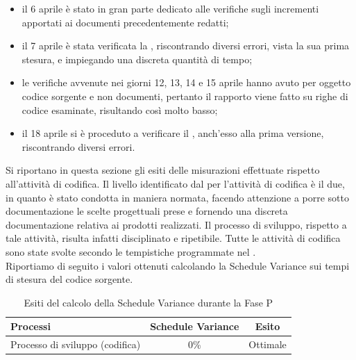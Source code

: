 \begin{itemize}
	\item il 6 aprile è stato in gran parte dedicato alle verifiche sugli incrementi apportati ai documenti precedentemente redatti;
	\item il 7 aprile è stata verificata la , riscontrando diversi errori, vista la sua prima stesura, e impiegando una discreta quantità di tempo;
	\item le verifiche avvenute nei giorni 12, 13, 14 e 15 aprile hanno avuto per oggetto codice sorgente e non documenti, pertanto il rapporto viene fatto su righe di codice esaminate, risultando così molto basso;
	\item il 18 aprile si è proceduto a verificare il , anch'esso alla prima versione, riscontrando diversi errori.
\end{itemize}

Si riportano in questa sezione gli esiti delle misurazioni effettuate rispetto all'attività di codifica.
Il livello  identificato dal \groupname{} per l'attività di codifica è il due, in quanto è stato condotta in maniera normata, facendo attenzione a porre sotto documentazione le scelte progettuali prese e fornendo una discreta documentazione relativa ai prodotti realizzati. Il processo di sviluppo, rispetto a tale attività, risulta infatti disciplinato e ripetibile.
Tutte le attività di codifica sono state svolte secondo le tempistiche programmate nel .\\

Riportiamo di seguito i valori ottenuti calcolando la Schedule Variance sui tempi di stesura del codice sorgente.
			\begin{table}[H]
				\centering
				\begin{tabu}{| l | c | c |}
					\hline
						Processi 							& Schedule Variance	& Esito		\\ \hline \hline
						Processo di sviluppo (codifica) & 0\% & Ottimale \\ \hline
				\end{tabu}
				\caption{Esiti del calcolo della Schedule Variance durante la Fase P}
			\end{table}	
			
